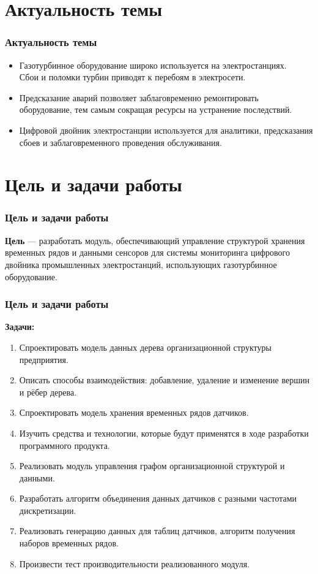 \documentclass[pdf, hyperref={unicode}, aspectratio=169]{beamer}
\begin{document}

{
	\frame{\titlepage}
}

\section{Актуальность темы}
\begin{frame}
	\frametitle{Актуальность темы}
	\begin{itemize}
		\item Газотурбинное оборудование широко используется на электростанциях.\\Сбои и поломки турбин приводят к перебоям в электросети.
		\item Предсказание аварий позволяет заблаговременно ремонтировать оборудование, тем самым сокращая ресурсы на устранение последствий.
		\item Цифровой двойник электростанции используется для аналитики, предсказания сбоев и заблаговременного проведения обслуживания.
	\end{itemize}
\end{frame}


\section{Цель и задачи работы}
\begin{frame}
	\frametitle{Цель и задачи работы}
	
	\textbf{Цель} --- разработать модуль, обеспечивающий управление структурой хранения временных рядов и данными сенсоров для системы мониторинга цифрового двойника промышленных электростанций, использующих газотурбинное оборудование.
\end{frame}


\begin{frame}
	\frametitle{Цель и задачи работы}
	
	\textbf{Задачи:}
	\begin{enumerate}
		\fontsize{10pt}{12pt}\selectfont
		\item Спроектировать модель данных дерева организационной структуры предприятия.
		\item Описать способы взаимодействия: добавление, удаление и изменение вершин и рёбер дерева.
		\item Спроектировать модель хранения временных рядов датчиков.
		\item Изучить средства и технологии, которые будут применятся в ходе разработки программного продукта.
		\item Реализовать модуль управления графом организационной структурой и данными.
		\item Разработать алгоритм объединения данных датчиков с разными частотами дискретизации.
		\item Реализовать генерацию данных для таблиц датчиков, алгоритм получения наборов временных рядов.
		\item Произвести тест производительности реализованного модуля.
	\end{enumerate}
\end{frame}
\end{document}

